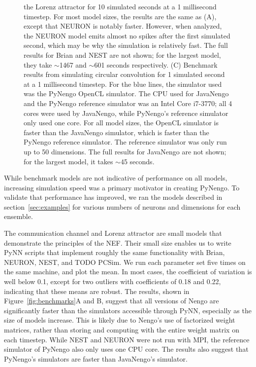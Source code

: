 \documentclass{frontiersSCNS}
\begin{document}
\begin{figure}
{     the Lorenz attractor for 10 simulated seconds
     at a 1 millisecond timestep.
     For most model sizes,
     the results are the same as (A),
     except that NEURON is notably faster.
     However, when analyzed, the NEURON model
     emits almost no spikes after the first
     simulated second, which may be
     why the simulation is relatively fast.
     The full results for Brian and NEST are not shown;
     for the largest model, they take $\sim$1467
     and $\sim$601 seconds respectively.
     (C) Benchmark results from simulating
     circular convolution for 1 simulated second
     at a 1 millisecond timestep.
     For the blue lines, the simulator used
     was the PyNengo OpenCL simulator.
     The CPU used for JavaNengo and
     the PyNengo reference simulator
     was an Intel Core i7-3770;
     all 4 cores were used by JavaNengo,
     while PyNengo's reference simulator
     only used one core.
     For all model sizes,
     the OpenCL simulator is faster
     than the JavaNengo simulator,
     which is faster than the PyNengo
     reference simulator.
     The reference simulator was only run
     up to 50 dimensions.
     The full results for JavaNengo
     are not shown; for the largest model,
     it takes $\sim$45 seconds.
     }
\end{figure}

While benchmark models are not indicative
of performance on all models,
increasing simulation speed
was a primary motivator in creating PyNengo.
To validate that performance has improved,
we ran the models described in section~\ref{sec:examples}
for various numbers of neurons and dimensions
for each ensemble.

The communication channel and Lorenz attractor
are small models that demonstrate
the principles of the NEF.
Their small size enables us to write
PyNN scripts that implement roughly
the same functionality
with Brian, NEURON, NEST, and TODO PCSim.
We run each parameter set five times
on the same machine,
and plot the mean.
In most cases, the coefficient of variation
is well below 0.1, except for two
outliers with coefficients of 0.18 and 0.22,
indicating that these means are robust.
The results, shown in Figure~\ref{fig:benchmarks}A and B,
suggest that all versions of Nengo are significantly
faster than the simulators accessible
through PyNN, especially
as the size of models increase.
This is likely due to Nengo's
use of factorized weight matrices,
rather than storing and computing with
the entire weight matrix
on each timestep.
While NEST and NEURON were not
run with MPI,
the reference simulator of PyNengo
also only uses one CPU core.
The results also suggest that PyNengo's
simulators are faster than JavaNengo's simulator.
\end{document}
